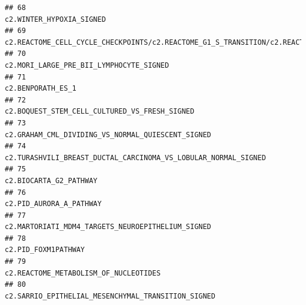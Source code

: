\documentclass{article}\usepackage[]{graphicx}\usepackage[]{color}
\makeatletter
\newenvironment{kframe}{%
 \def\at@end@of@kframe{}%
 \ifinner\ifhmode%
  \def\at@end@of@kframe{\end{minipage}}%
  \begin{minipage}{\columnwidth}%
 \fi\fi%
 \def\FrameCommand##1{\hskip\@totalleftmargin \hskip-\fboxsep
 \colorbox{shadecolor}{##1}\hskip-\fboxsep
     \hskip-\linewidth \hskip-\@totalleftmargin \hskip\columnwidth}%
 \MakeFramed {\advance\hsize-\width
   \@totalleftmargin\z@ \linewidth\hsize
   \@setminipage}}%
 {\par\unskip\endMakeFramed%
 \at@end@of@kframe}
\newenvironment{knitrout}{}{} %
\makeatother
\begin{document}
\begin{knitrout}
\begin{kframe}
\begin{verbatim}
## 68                                                                                                                                                                                          c2.WINTER_HYPOXIA_SIGNED
## 69  c2.REACTOME_CELL_CYCLE_CHECKPOINTS/c2.REACTOME_G1_S_TRANSITION/c2.REACTOME_SYNTHESIS_OF_DNA/c2.REACTOME_MITOTIC_G1_G1_S_PHASES/c2.REACTOME_MITOTIC_M_M_G1_PHASES/c2.REACTOME_DNA_REPLICATION/c2.REACTOME_S_PHASE
## 70                                                                                                                                                                           c2.MORI_LARGE_PRE_BII_LYMPHOCYTE_SIGNED
## 71                                                                                                                                                                                                 c2.BENPORATH_ES_1
## 72                                                                                                                                                                     c2.BOQUEST_STEM_CELL_CULTURED_VS_FRESH_SIGNED
## 73                                                                                                                                                                 c2.GRAHAM_CML_DIVIDING_VS_NORMAL_QUIESCENT_SIGNED
## 74                                                                                                                                                    c2.TURASHVILI_BREAST_DUCTAL_CARCINOMA_VS_LOBULAR_NORMAL_SIGNED
## 75                                                                                                                                                                                            c2.BIOCARTA_G2_PATHWAY
## 76                                                                                                                                                                                           c2.PID_AURORA_A_PATHWAY
## 77                                                                                                                                                                 c2.MARTORIATI_MDM4_TARGETS_NEUROEPITHELIUM_SIGNED
## 78                                                                                                                                                                                               c2.PID_FOXM1PATHWAY
## 79                                                                                                                                                                             c2.REACTOME_METABOLISM_OF_NUCLEOTIDES
## 80                                                                                                                                                                c2.SARRIO_EPITHELIAL_MESENCHYMAL_TRANSITION_SIGNED

\end{verbatim}
\end{kframe}
\end{knitrout}
\end{document}
